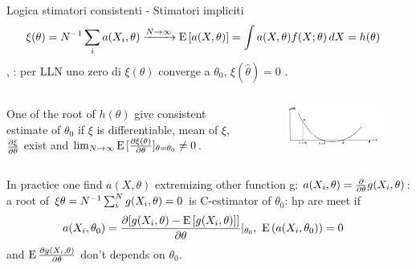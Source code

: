 \documentclass[asd-beamer.tex]{subfiles}
\begin{document}
\begin{frame}{Logica stimatori consistenti - Stimatori impliciti}
\begin{align*}
&\xi(\theta)={N}^{-1}\sum_ia(X_i,\theta)\xrightarrow{N\to\infty}\operatorname{E}{[a(X,\theta)]}=\int a(X,\theta)f(X;\theta)\,dX=h(\theta)
\end{align*}
, : per LLN uno zero di $\xi(\theta)$ converge a $\theta_0$, $\xi(\hat{\theta})=0$ .
\begin{columns}[T]
\begin{column}{0.6\textwidth}
One of the root of $h(\theta)$ give consistent estimate of $\theta_0$ if $\xi$ is differentiable, mean of $\xi$, $\frac{\partial \xi}{\partial \theta}$ exist and $\lim_{N\to\infty}\operatorname{E}{[\frac{\partial \xi(\theta)}{\partial \theta}]_{\theta=\theta_0}}\neq0$.
\end{column}
\begin{column}{0.4\textwidth}
\begin{figure}
	\centering
	\includegraphics[width=0.99\textwidth,keepaspectratio]{figures/james/estimators/estimpl}
	\label{fig:estimpl}
\end{figure}
\end{column}
\end{columns}

In practice one find $a(X,\theta)$ extremizing other function g: $a(X_i,\theta)=\frac{\partial}{\partial \theta}g(X_i,\theta)$: a root of $\xi{\theta}={N}^{-1}\sum_i^Ng(X_i,\theta)=0$ is C-estimator of $\theta_0$: hp are meet if
\begin{align*}
&a(X_i,\theta_0)=\PDy{\theta}{[g(X_i,\theta)-\E{[g(X_i,\theta)]}]}|_{\theta_0},\ \E{(a(X_i,\theta_0))}=0
\end{align*}
and $\operatorname{E}{\frac{\partial g(X_i,\theta)}{\partial \theta}}$ don't depends on $\theta_0$.
\end{frame}
\end{document}
